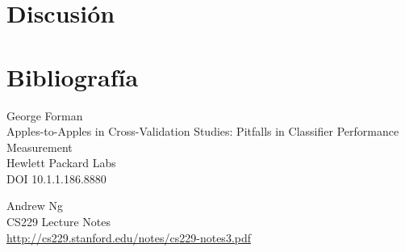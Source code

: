 \documentclass{article}
\begin{document}
\section{Discusión}

\section{Bibliografía}

\begin{thebibliography}{9}

	George Forman \\
	Apples-to-Apples in Cross-Validation Studies: Pitfalls in Classifier Performance Measurement \\
	Hewlett Packard Labs \\
	DOI 10.1.1.186.8880

    Andrew Ng \\
	CS229 Lecture Notes \\
	\url{http://cs229.stanford.edu/notes/cs229-notes3.pdf}

\end{thebibliography}
\end{document}
